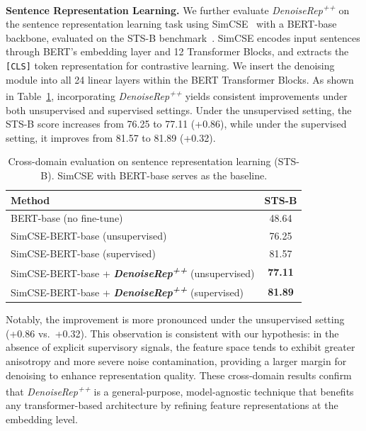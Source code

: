 \documentclass[conference]{IEEEtran}
\begin{document}
{{\textbf{Sentence Representation Learning.}
We further evaluate \textit{DenoiseRep\textsuperscript{++}} on the sentence representation learning task using SimCSE~\cite{gao2021simcse} with a BERT-base~\cite{devlin2019bert} backbone, evaluated on the STS-B benchmark~\cite{cer2017semeval}. SimCSE encodes input sentences through BERT's embedding layer and 12 Transformer Blocks, and extracts the \texttt{[CLS]} token representation for contrastive learning. We insert the denoising module into all 24 linear layers within the BERT Transformer Blocks. As shown in Table~\ref{tab:cross_domain_nlp}, incorporating \textit{DenoiseRep\textsuperscript{++}} yields consistent improvements under both unsupervised and supervised settings. Under the unsupervised setting, the STS-B score increases from 76.25 to 77.11 (+0.86), while under the supervised setting, it improves from 81.57 to 81.89 (+0.32).

\begin{table}[t]
\centering
\caption{Cross-domain evaluation on sentence representation learning (STS-B). SimCSE with BERT-base serves as the baseline.}
\label{tab:cross_domain_nlp}
\vspace{0.2cm}
\renewcommand{\arraystretch}{1.2}
\begin{tabular}{l|c}
\hline \hline
\textbf{Method} & \textbf{STS-B} \\
\hline
BERT-base (no fine-tune) & 48.64 \\
SimCSE-BERT-base (unsupervised) & 76.25 \\
SimCSE-BERT-base (supervised) & 81.57 \\
\hline
SimCSE-BERT-base + \textit{\textbf{DenoiseRep\textsuperscript{++}}} (unsupervised) & \textbf{77.11} \\
SimCSE-BERT-base + \textit{\textbf{DenoiseRep\textsuperscript{++}}} (supervised) & \textbf{81.89} \\
\hline \hline
\end{tabular}
\end{table}

Notably, the improvement is more pronounced under the unsupervised setting (+0.86 vs.~+0.32). This observation is consistent with our hypothesis: in the absence of explicit supervisory signals, the feature space tends to exhibit greater anisotropy and more severe noise contamination, providing a larger margin for denoising to enhance representation quality. These cross-domain results confirm that \textit{DenoiseRep\textsuperscript{++}} is a general-purpose, model-agnostic technique that benefits any transformer-based architecture by refining feature representations at the embedding level.
}%


}
\end{document}

